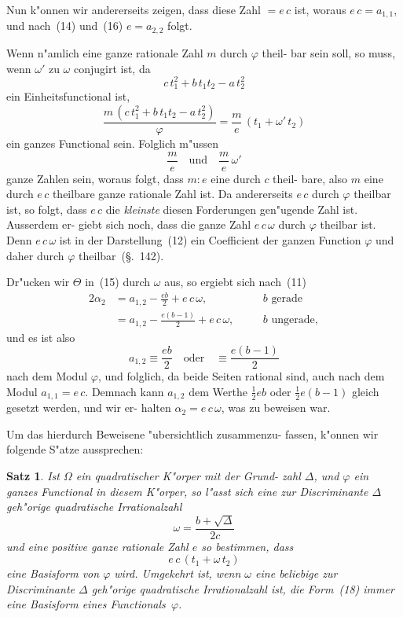 \documentclass[12pt,a4paper]{article}
\theoremstyle{weber}
\newtheorem*{satz}{Satz}
\begin{document}
Nun k"onnen wir andererseits zeigen, dass diese Zahl $= e\,c$
ist, woraus $e\,c = a_{1,1}$, und nach~(14) und~(16) $e = a_{2,2}$ folgt.

Wenn n"amlich eine ganze rationale Zahl $m$ durch $\varphi$ theil-
bar sein soll, so muss, wenn $\omega'$ zu $\omega$ conjugirt ist, da
\[
c\,t_1^2 + b\,t_1t_2 - a\,t_2^2
\]
ein Einheitsfunctional ist,
\[
\frac{m\,(c\,t_1^2 + b\,t_1t_2 - a\,t_2^2)}{\varphi} = \frac{m}{e}\,(t_1 + \omega'\,t_2)
\]
ein ganzes Functional sein. Folglich m"ussen
\[
\frac{m}{e} \quad \text{und} \quad \frac{m}{e}\,\omega'
\]
ganze Zahlen sein, woraus folgt, dass $m : e$ eine durch $c$ theil-
bare, also $m$ eine durch $e\,c$ theilbare ganze rationale Zahl ist.
Da andererseits $e\,c$ durch $\varphi$ theilbar ist, so folgt, dass $e\,c$ die
\emph{kleinste} diesen Forderungen gen"ugende Zahl ist. Ausserdem er-
giebt sich noch, dass die ganze Zahl $e\,c\,\omega$ durch $\varphi$ theilbar ist.
Denn $e\,c\,\omega$ ist in der Darstellung~(12) ein Coefficient der ganzen
Function $\varphi$ und daher durch $\varphi$ theilbar~(\S.~142).

Dr"ucken wir $\varTheta$ in~(15) durch $\omega$ aus, so ergiebt sich nach~(11)
\begin{alignat*}{2}
\alpha_2 &= a_{1,2} - \frac{eb}{2} + e\,c\,\omega, &\quad &b \text{ gerade} \\
         &= a_{1,2} - \frac{e(b-1)}{2} + e\,c\,\omega, &\quad &b \text{ ungerade},
\end{alignat*}
und es ist also
\[
a_{1,2} \equiv \frac{eb}{2} \quad \text{oder} \quad \equiv \frac{e(b-1)}{2}
\]
nach dem Modul $\varphi$, und folglich, da beide Seiten rational sind,
auch nach dem Modul $a_{1,1} = e\,c$. Demnach kann $a_{1,2}$ dem
Werthe $\frac{1}{2}eb$ oder $\frac{1}{2}e(b-1)$ gleich gesetzt werden, und wir er-
halten $\alpha_2 = e\,c\,\omega$, was zu beweisen war.

Um das hierdurch Beweisene "ubersichtlich zusammenzu-
fassen, k"onnen wir folgende S"atze aussprechen:

\begin{satz}
Ist $\varOmega$ ein quadratischer K"orper mit der Grund-
zahl $\varDelta$, und $\varphi$ ein ganzes Functional in diesem
K"orper, so l"asst sich eine zur Discriminante $\varDelta$
geh"orige quadratische Irrationalzahl
\begin{equation}\label{eq:s166-17}
\omega = \frac{b + \sqrt{\varDelta}}{2c}
\end{equation}
und eine positive ganze rationale Zahl $e$ so
bestimmen, dass
\begin{equation}\label{eq:s166-18}
e\,c\,(t_1 + \omega\,t_2)
\end{equation}
eine Basisform von $\varphi$ wird. Umgekehrt ist, wenn
$\omega$ eine beliebige zur Discriminante $\varDelta$ geh"orige
quadratische Irrationalzahl ist, die Form~(18)
immer eine Basisform eines Functionals~$\varphi$.
\end{satz}
\end{document}
